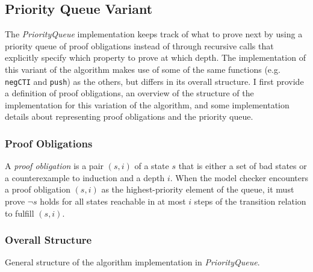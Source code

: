 \documentclass[12pt,a4paper,twoside,openright]{report}
\begin{document}
{\subsection{Priority Queue Variant}
\label{pqueue}

The \emph{PriorityQueue} implementation keeps track of what to prove next by using a priority
queue of proof obligations instead of through recursive calls that explicitly specify which
property to prove at which depth. The implementation of this variant of the algorithm makes
use of some of the same functions (e.g. \verb,negCTI, and \verb,push,) as the others, but
differs in its overall structure.
I first provide a definition of proof obligations, an
overview of the structure of the implementation for this variation of the algorithm,
and some implementation details about representing proof obligations and the priority queue.

\subsubsection{Proof Obligations}
A \emph{proof obligation} is a pair $(s,i)$ of a state $s$ that is either a set of bad states
or a counterexample to induction and a depth $i$. When the model checker encounters a proof obligation
$(s,i)$ as the highest-priority element of the queue, it must prove $\neg s$ holds for all states
reachable in at most $i$ steps of the transition relation to fulfill
$(s, i)$.

\subsubsection{Overall Structure}
\begin{algorithm}[!Ht]
\DontPrintSemicolon
{}
\Fn{fulfillObligations$(M,[F_0,\ldots,F_k],{\it queue}])$}{
  \Let{$((s,i), {\it q}) = {\it dequeue(queue)}$ \label{dequeue}}{
  \lIf{$F_{i - 1} \wedge T \Rightarrow \neg s'$}{\Return{${\it pushFrame(M, [F_0, \dots, F_k], q, (s,i))}$}}
  }
  \lElse{\Let{${\it cti = nextCTI(F_{i - 1} \wedge T \Rightarrow \neg s')}$}{
      \If{$I \Rightarrow \neg {\it cti}$}{
        \Let{${\it (fixed, [G_0, \ldots, G_k], d) = propagate([F_0 \cup \{\neg cti\}, F_1, \ldots, F_k], {\it \neg cti})}$}{
          \lIf{\it fixed}{\Return{True}}
          \Return{${\it fulfillObligation(M, [G_0 , \ldots, G_k], (generalize(\neg cti, d),d))}$}
        }
      }
      \lElse{\Return{False}}}}
}
\caption{General structure of the algorithm implementation in {\it PriorityQueue}.}
\label{pqueuestr}
\end{algorithm}

}
\end{document}
